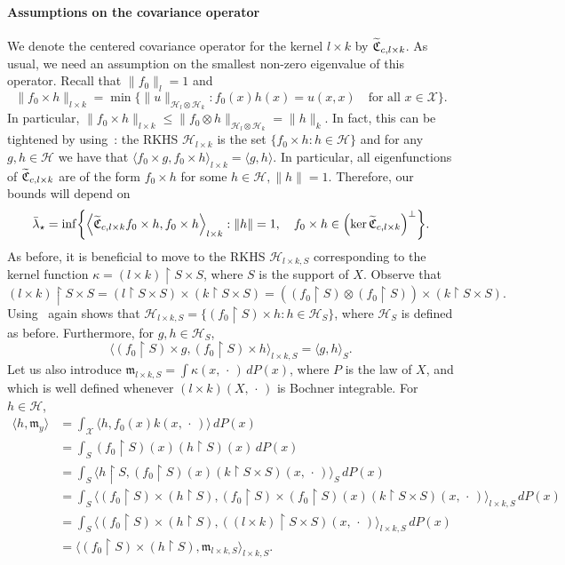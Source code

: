 \documentclass[AHL,Unicode,longabstracts,published]{cedram}
\theoremstyle{remark}
\newcommand{\restr}
{\!\!\upharpoonright\!}
\newcommand{\restrr}
{\!\!\upharpoonright\!\!}
\newcommand{\X}{\mathcal{X}}
\newcommand{\cH}{\mathcal{H}}
\newcommand{\fkC}{\mathfrak{C}}
\newcommand{\mean}{\mathfrak{m}}
\let\oldtilde\tilde
\renewcommand*{\tilde}[1]{\mathchoice{\widetilde{#1}}{\widetilde{#1}}{\oldtilde{#1}}{\oldtilde{#1}}}
\let\originalleft\left
\let\originalright\right
\renewcommand{\left}{\mathopen{}\mathclose\bgroup\originalleft}
\renewcommand{\right}{\aftergroup\egroup\originalright}
\begin{document}
\paragraph{Assumptions on the covariance operator}
We denote the centered covariance operator for the kernel $l \times k$ by $\tilde{\fkC}_{c,l\times k}$. As usual, we need an assumption on the smallest non-zero eigenvalue of this operator. Recall that $\|f_0\|_{l} = 1$ and
\[
\|f_0 \times h\|_{l \times k} = \min \bigl\{ \|u\|_{\cH_l \otimes \cH_k} : f_0(x) h(x) = u(x,x) \quad\text{for all } x\in \X\bigr\}.
\]
In particular, $\|f_0 \times h\|_{l \times k} \leq \|f_0 \otimes h \|_{\cH_l \otimes \cH_k} = \|h\|_k$. In fact, this can be tightened by using~\cite[Proposition~5.20]{PAUL16}: the RKHS $\cH_{l \times k}$ is the set $\{ f_0 \times h: h \in \cH\}$ and for any $g,h \in \cH$ we have that $\langle f_0 \times g, f_0 \times h \rangle_{l \times k} = \langle g, h \rangle$. In particular, all eigenfunctions\pagebreak{} of $\tilde{\fkC}_{c,l\times k}$ are of the form $f_0 \times h$ for some $h\in \cH, \|h\|=1$. Therefore, our bounds will depend on
\begin{equation}
\bar \lambda_\star = \inf \left\{ \left\langle \tilde{\fkC}_{c,l\times k} f_0 \times h, f_0 \times h \right\rangle_{l \times k} : \|h \|= 1,\quad f_0 \times h \in \left(\ker \tilde{\fkC}_{c,l\times k}\right)^\perp \right\}.
\end{equation}
As before, it is beneficial to move to the RKHS $\cH_{l\times k,S}$ corresponding to the kernel function $\kappa = (l \times k)\restrr S \times S$, where $S$ is the support of $X$. Observe that
\[
(l \times k) \restr S \times S = (l \restr S \times S) \times (k \restr S \times S) = ((f_0 \restr S) \otimes (f_0 \restr S)) \times(k \restr S \times S).
\]
Using~\cite[Proposition~5.20]{PAUL16} again shows that $\cH_{l\times k,S} = \{ (f_0 \restr S) \times h : h \in \cH_S \}$, where $\cH_S$ is defined as before. Furthermore, for $g,h \in \cH_S$,
\[
\langle (f_0 \restr S) \times g, (f_0 \restr S) \times h \rangle_{l\times k, S} =
\langle g, h \rangle_S.
\]
Let us also introduce $\mean_{l\times k, S} = \int \kappa(x, \,\cdot\,) \,dP(x)$, where $P$ is the law of $X$, and which is well defined whenever $(l \times k)(X,\,\cdot\,)$ is Bochner integrable. For $h\in \cH$,
\begin{align*}
\langle h, \mean_y \rangle &= \int_\X \langle h, f_0(x) k(x,\,\cdot\,) \rangle \,dP(x) \\
&= \int_S (f_0 \restr S)(x) (h\restr S) (x) \, dP(x) \\
&= \int_S \bigl\langle h\restr S, (f_0\restr S)(x) (k\restr S\times S)(x,\,\cdot\,) \bigr\rangle_S \,dP(x) \\
&=\int_S \bigl\langle (f_0 \restr S)\times (h\restr S), (f_0\restr S) \times (f_0\restr S)(x) (k\restr S\times S)(x,\,\cdot\,) \bigr\rangle_{l\times k,S} \,dP(x) \\
&=\int_S \bigl\langle (f_0 \restr S)\times (h\restr S), ((l \times k)\restr S \times S)(x,\,\cdot\,) \bigr\rangle_{l\times k,S} \,dP(x) \\
&= \bigl\langle (f_0 \restr S)\times (h\restr S), \mean_{l\times k,S} \bigr\rangle_{l\times k, S}.
\end{align*}
\end{document}
